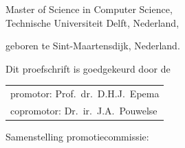 \begin{titlepage}
\begin{center}
\bigskip
\bigskip

Master of Science in Computer Science, \\
Technische Universiteit Delft, Nederland,

geboren te Sint-Maartensdijk, Nederland.

\vspace*{2\bigskipamount}

\end{center}

\clearpage
\thispagestyle{empty}

\noindent Dit proefschrift is goedgekeurd door de

\medskip\noindent
\begin{tabular}{l}
    promotor: Prof.\ dr.\ D.H.J.\ Epema \\
    copromotor: Dr.\ ir.\ J.A.\ Pouwelse
\end{tabular}

\bigskip
\noindent Samenstelling promotiecommissie:

\medskip\noindent

    


\end{titlepage}
